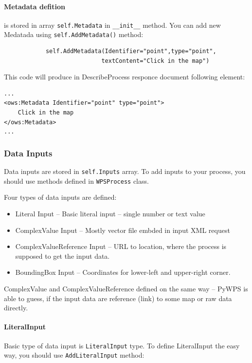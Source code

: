 \documentclass[a4paper,11pt]{article}
\begin{document}
\paragraph{Metadata defition} is stored in array \texttt{self.Metadata} in
\texttt{\_\_init\_\_} method. You can add new Medatada using
\texttt{self.AddMetadata()} method:
\begin{verbatim}
            self.AddMetadata(Identifier="point",type="point",
                            textContent="Click in the map")
\end{verbatim}

This code will produce in DescribeProcess responce document following
element:
\begin{verbatim}
...
<ows:Metadata Identifier="point" type="point">
    Click in the map
</ows:Metadata>
...
\end{verbatim}

\subsubsection{Data Inputs}
Data inputs are stored in \texttt{self.Inputs} array. To add inputs to
your process, you should use methods defined in \texttt{WPSProcess} class.

Four types of data inputs are defined:
\begin{itemize}
    \item Literal Input -- Basic literal input -- single number or text
    value
    \item ComplexValue Input  -- Mostly vector file embded in input XML
    request
    \item ComplexValueReference Input -- URL to location, where the process
    is supposed to get the input data.
    \item BoundingBox Input -- Coordinates for lower-left and upper-right
    corner.
\end{itemize}

ComplexValue and ComplexValueReference defined on the same way -- PyWPS is
able to guess, if the input data are reference (link) to some map or raw
data directly.

\paragraph{LiteralInput}

Basic type of data input is \texttt{LiteralInput} type. To define
LiteralInput the easy way, you should use \texttt{AddLiteralInput} method:
\end{document}

